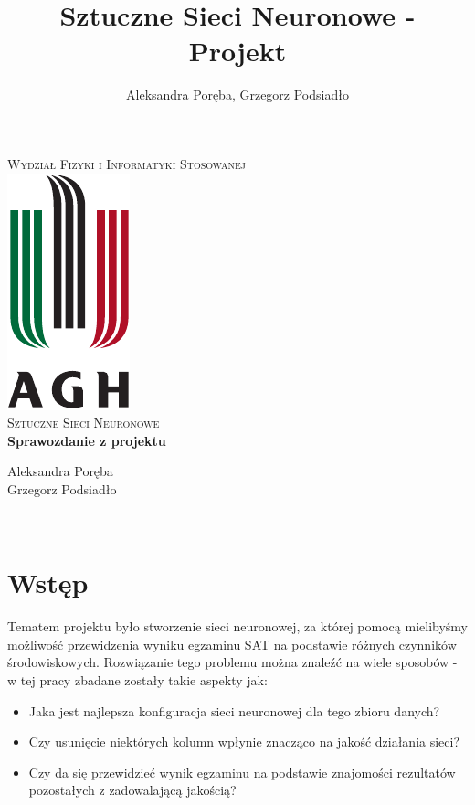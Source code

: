 \documentclass[12pt]{article}
\title{Sztuczne Sieci Neuronowe - Projekt}
\author{Aleksandra Poręba, Grzegorz Podsiadło}
\makeatletter
\let\thetitle\@title
\let\theauthor\@author
\makeatother
\begin{document}
\begin{center}
\textsc{\normalsize Wydział Fizyki i Informatyki Stosowanej}\\[2.0cm] 
\includegraphics[scale = 1]{logo.pdf}\\[1cm] 
\textsc{\Large Sztuczne Sieci Neuronowe}\\[0.4cm] 


{ \huge \bfseries \LARGE{Sprawozdanie z projektu} } 

\flushright \Large Aleksandra Poręba \\ Grzegorz Podsiadło

\vfill 

\center {\today}\\[2cm] 


\pagebreak 

\end{center}

\setcounter{tocdepth}{2}
\tableofcontents
\pagebreak


\pagestyle{fancy}
\fancyhf{}

\rhead{\theauthor}
\lhead{\thetitle}
\cfoot{\thepage}

\section{Wstęp}
Tematem projektu było stworzenie sieci neuronowej, za której pomocą mielibyśmy możliwość przewidzenia wyniku egzaminu SAT na podstawie różnych czynników środowiskowych. Rozwiązanie tego problemu można znaleźć na wiele sposobów - w tej pracy zbadane zostały takie aspekty jak:
\begin{itemize}
\item Jaka jest najlepsza konfiguracja sieci neuronowej dla tego zbioru danych?
\item Czy usunięcie niektórych kolumn wpłynie znacząco na jakość działania sieci?
\item Czy da się przewidzieć wynik egzaminu na podstawie znajomości rezultatów pozostałych z zadowalającą jakością?
\end{itemize}
\end{document}
